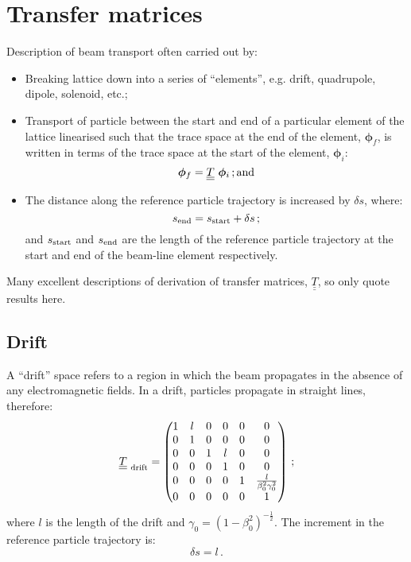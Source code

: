 \graphicspath{ {04-TransferMatrices/Figures/} }

\section{Transfer matrices}

Description of beam transport often carried out by:
\begin{itemize}
  \item Breaking lattice down into a series of ``elements'',
    e.g. drift, quadrupole, dipole, solenoid, etc.;
  \item Transport of particle between the start and end of a
    particular element of the lattice linearised such that the trace
    space at the end of the element, $\bm{\phi}_f$, is written in
    terms of the trace space at the start of the element,
    $\bm{\phi}_i$:
    \begin{equation}
      \bm{\phi}_f = \underline{\underline{T}} ~ \bm{\phi}_i \,
      {\rm ; and}
    \end{equation}
  \item The distance along the reference particle trajectory is
    increased by $\delta s$, where:
    \begin{equation}
      s_{\rm end} = s_{\rm start} + \delta s \, ;
    \end{equation}
    and $s_{\rm start}$ and $s_{\rm end}$ are the length of the
    reference particle trajectory at the start and end of the 
    beam-line element respectively.
\end{itemize}
Many excellent descriptions of derivation of transfer matrices,
$\underline{\underline{T}}$, so only quote results here.

\subsection{Drift}

A ``drift'' space refers to a region in which the beam propagates in
the absence of any electromagnetic fields.
In a drift, particles propagate in straight lines, therefore:
\begin{equation}
  \underline{\underline{T}}_{\rm~drift} =
        \begin{pmatrix}
          1 & l & 0 & 0 & 0 &                             0 \\
          0 & 1 & 0 & 0 & 0 &                             0 \\
          0 & 0 & 1 & l & 0 &                             0 \\
          0 & 0 & 0 & 1 & 0 &                             0 \\
          0 & 0 & 0 & 0 & 1 & \frac{l}{\beta_0^2 \gamma_0^2} \\
          0 & 0 & 0 & 0 & 0 &                             1
        \end{pmatrix} \, ; 
\end{equation}
where $l$ is the length of the drift and
$\gamma_0=(1-\beta_0^2)^{-\frac{1}{2}}$.
The increment in the reference particle trajectory is:
\begin{equation}
  \delta s = l \, .
\end{equation}


